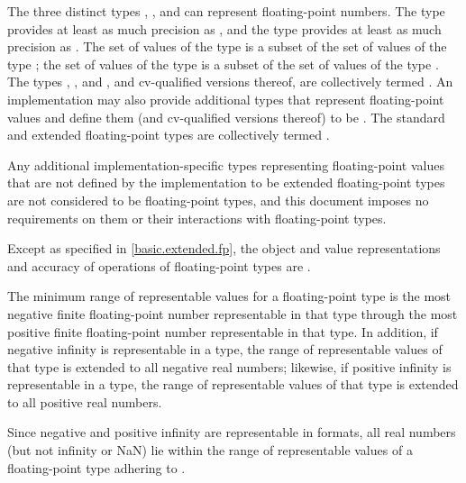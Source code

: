 \pnum
{}%
The three distinct types
%
,
%
,
and
%
can represent floating-point numbers.
The type  provides at least as much
precision as , and the type  provides at
least as much precision as . The set of values of the type
 is a subset of the set of values of the type
; the set of values of the type  is a subset
of the set of values of the type .
The types
, , and ,
and cv-qualified versions thereof,
are collectively termed
.
An implementation may also provide additional types
that represent floating-point values and define them (and cv-qualified versions thereof) to be
.
The standard and extended floating-point types
are collectively termed .
\begin{note}
Any additional implementation-specific types representing floating-point values
that are not defined by the implementation to be extended floating-point types
are not considered to be floating-point types, and
this document imposes no requirements on them or
their interactions with floating-point types.
\end{note}
Except as specified in \ref{basic.extended.fp},
the object and value representations and accuracy of operations
of floating-point types are .

\pnum
The minimum range of representable values for a floating-point type is
the most negative finite floating-point number representable
in that type through
the most positive finite floating-point number representable in that type.
In addition, if negative infinity is representable in a type,
the range of representable values of that type is extended to all negative real numbers;
likewise, if positive infinity is representable in a type,
the range of representable values of that type is extended to all positive real numbers.
\begin{note}
Since negative and positive infinity are representable
in \IsoFloatUndated{} formats,
all real numbers (but not infinity or NaN)
lie within the range of representable values of
a floating-point type adhering to \IsoFloatUndated{}.
\end{note}

